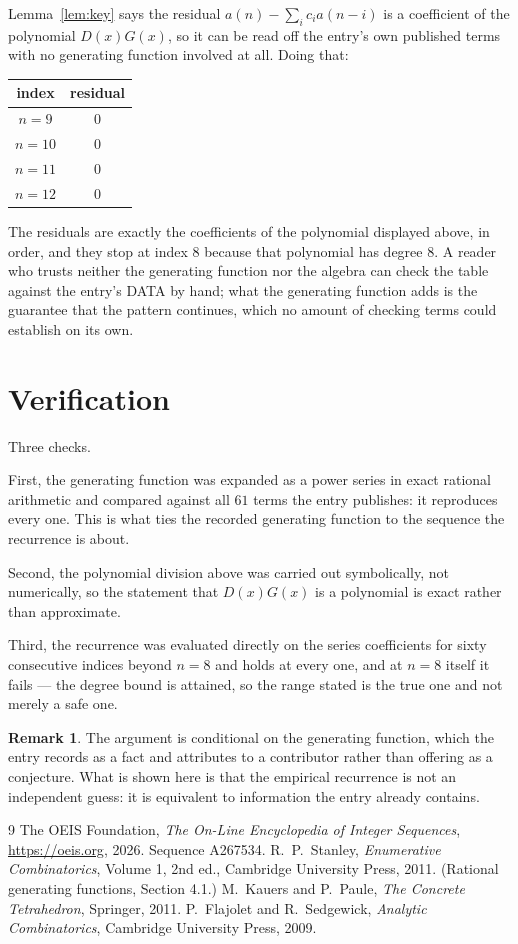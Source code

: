 \documentclass[11pt,a4paper]{article}
\theoremstyle{plain}
\theoremstyle{definition}
\newtheorem{remark}[theorem]{Remark}
\begin{document}
Lemma~\ref{lem:key} says the residual $a(n)-\sum_ic_ia(n-i)$ is a coefficient of the
polynomial $D(x)G(x)$, so it can be read off the entry's own published terms with no
generating function involved at all. Doing that:
\begin{center}
\begin{tabular}{cc}
index & residual \\ \hline
$n=9$ & $0$ \\
$n=10$ & $0$ \\
$n=11$ & $0$ \\
$n=12$ & $0$
\end{tabular}
\end{center}
The residuals are exactly the coefficients of the polynomial displayed above, in order, and
they stop at index $8$ because that polynomial has degree $8$. A reader who trusts
neither the generating function nor the algebra can check the table against the entry's DATA
by hand; what the generating function adds is the guarantee that the pattern continues, which
no amount of checking terms could establish on its own.

\section{Verification}

Three checks.

First, the generating function was expanded as a power series in exact rational arithmetic and
compared against all $61$ terms the entry publishes: it reproduces every one. This is
what ties the recorded generating function to the sequence the recurrence is about.

Second, the polynomial division above was carried out symbolically, not numerically, so the
statement that $D(x)G(x)$ is a polynomial is exact rather than approximate.

Third, the recurrence was evaluated directly on the series coefficients for sixty consecutive
indices beyond $n=8$ and holds at every one, and at $n=8$ itself it fails --- the
degree bound is attained, so the range stated is the true one and not merely a safe one.

\begin{remark}
The argument is conditional on the generating function, which the entry records as a fact and
attributes to a contributor rather than offering as a conjecture. What is shown here is that
the empirical recurrence is not an independent guess: it is equivalent to information the
entry already contains.
\end{remark}

\begin{thebibliography}{9}
 The OEIS Foundation, \emph{The On-Line Encyclopedia of Integer
Sequences}, \url{https://oeis.org}, 2026. Sequence A267534.
 R.~P.~Stanley, \emph{Enumerative Combinatorics}, Volume 1, 2nd ed.,
Cambridge University Press, 2011. (Rational generating functions, Section 4.1.)
 M.~Kauers and P.~Paule, \emph{The Concrete Tetrahedron}, Springer, 2011.
 P.~Flajolet and R.~Sedgewick, \emph{Analytic Combinatorics}, Cambridge
University Press, 2009.
\end{thebibliography}
\end{document}

